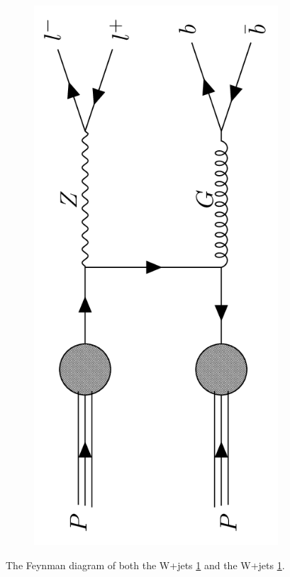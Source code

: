 \begin{figure}
{\begin{subfigure}{.2\textwidth}
        \caption{}
        \label{fig:w_pjets}
    \end{subfigure}
    \hfill
    \begin{subfigure}{.2\textwidth}
        \includegraphics[width=\textwidth, angle = -90]{Figures/FDiagrams/Z_pjets.png}
        \caption{}
        \label{fig:z_pjets}
    \end{subfigure}
    }
    \caption{The Feynman diagram of both the W+jets \ref{fig:w_pjets} and the W+jets \ref{fig:w_pjets}.}
\end{figure}